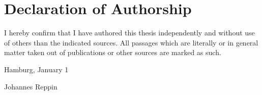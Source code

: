 
\section*{Declaration of Authorship}

I hereby confirm that I have authored this thesis independently and without use of others than the indicated
sources. All passages which are literally or in general matter
taken out of publications or other sources are marked as such.
\vspace{1cm}

Hamburg, January 1 \vspace{0.5cm}

Johannes Reppin